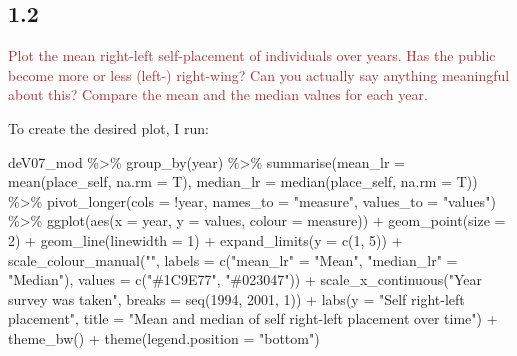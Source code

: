 \documentclass[
]{article}
\newenvironment{Shaded}{\begin{snugshade}}{\end{snugshade}}
\newcommand{\AttributeTok}[1]{\textcolor[rgb]{0.77,0.63,0.00}{#1}}
\newcommand{\DecValTok}[1]{\textcolor[rgb]{0.00,0.00,0.81}{#1}}
\newcommand{\FunctionTok}[1]{\textcolor[rgb]{0.00,0.00,0.00}{#1}}
\newcommand{\NormalTok}[1]{#1}
\newcommand{\OtherTok}[1]{\textcolor[rgb]{0.56,0.35,0.01}{#1}}
\newcommand{\SpecialCharTok}[1]{\textcolor[rgb]{0.00,0.00,0.00}{#1}}
\newcommand{\StringTok}[1]{\textcolor[rgb]{0.31,0.60,0.02}{#1}}
\begin{document}
\hypertarget{section-1}{%
\subsection{1.2}\label{section-1}}

\textcolor{brown}{Plot the mean right-left self-placement of individuals over years. Has the public become more or less (left-) right-wing? Can you actually say anything meaningful about this? Compare the mean and the median values for each year.}

To create the desired plot, I run:

\begin{Shaded}
\begin{Highlighting}[]
\NormalTok{deV07\_mod }\SpecialCharTok{\%\textgreater{}\%}
  \FunctionTok{group\_by}\NormalTok{(year) }\SpecialCharTok{\%\textgreater{}\%}
  \FunctionTok{summarise}\NormalTok{(}\AttributeTok{mean\_lr =} \FunctionTok{mean}\NormalTok{(place\_self, }\AttributeTok{na.rm =}\NormalTok{ T),}
            \AttributeTok{median\_lr =} \FunctionTok{median}\NormalTok{(place\_self, }\AttributeTok{na.rm =}\NormalTok{ T)) }\SpecialCharTok{\%\textgreater{}\%}
  \FunctionTok{pivot\_longer}\NormalTok{(}\AttributeTok{cols =} \SpecialCharTok{!}\NormalTok{year, }\AttributeTok{names\_to =} \StringTok{"measure"}\NormalTok{, }\AttributeTok{values\_to =} \StringTok{"values"}\NormalTok{) }\SpecialCharTok{\%\textgreater{}\%}
  \FunctionTok{ggplot}\NormalTok{(}\FunctionTok{aes}\NormalTok{(}\AttributeTok{x =}\NormalTok{ year, }\AttributeTok{y =}\NormalTok{ values, }\AttributeTok{colour =}\NormalTok{ measure)) }\SpecialCharTok{+}
  \FunctionTok{geom\_point}\NormalTok{(}\AttributeTok{size =} \DecValTok{2}\NormalTok{) }\SpecialCharTok{+}
  \FunctionTok{geom\_line}\NormalTok{(}\AttributeTok{linewidth =} \DecValTok{1}\NormalTok{) }\SpecialCharTok{+}
  \FunctionTok{expand\_limits}\NormalTok{(}\AttributeTok{y =} \FunctionTok{c}\NormalTok{(}\DecValTok{1}\NormalTok{, }\DecValTok{5}\NormalTok{)) }\SpecialCharTok{+}
  \FunctionTok{scale\_colour\_manual}\NormalTok{(}\StringTok{""}\NormalTok{, }
                       \AttributeTok{labels =} \FunctionTok{c}\NormalTok{(}\StringTok{"mean\_lr"} \OtherTok{=} \StringTok{"Mean"}\NormalTok{, }
                                  \StringTok{"median\_lr"} \OtherTok{=} \StringTok{"Median"}\NormalTok{),}
                       \AttributeTok{values =} \FunctionTok{c}\NormalTok{(}\StringTok{"\#1C9E77"}\NormalTok{, }\StringTok{"\#023047"}\NormalTok{)) }\SpecialCharTok{+}
  \FunctionTok{scale\_x\_continuous}\NormalTok{(}\StringTok{"Year survey was taken"}\NormalTok{, }
                     \AttributeTok{breaks =} \FunctionTok{seq}\NormalTok{(}\DecValTok{1994}\NormalTok{, }\DecValTok{2001}\NormalTok{, }\DecValTok{1}\NormalTok{)) }\SpecialCharTok{+}
  \FunctionTok{labs}\NormalTok{(}\AttributeTok{y =} \StringTok{"Self right{-}left placement"}\NormalTok{, }
       \AttributeTok{title =} \StringTok{"Mean and median of self right{-}left placement over time"}\NormalTok{) }\SpecialCharTok{+}
  \FunctionTok{theme\_bw}\NormalTok{() }\SpecialCharTok{+}
  \FunctionTok{theme}\NormalTok{(}\AttributeTok{legend.position =} \StringTok{"bottom"}\NormalTok{)}
\end{Highlighting}
\end{Shaded}
\end{document}
